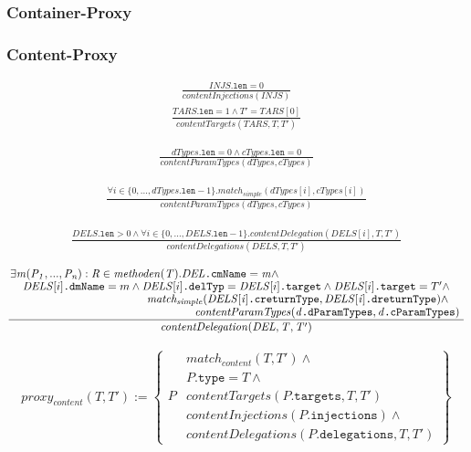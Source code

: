 \documentclass[a4paper,12pt]{article}
\begin{document}
\subsubsection{Container-Proxy}
\subsubsection{Content-Proxy}

\begin{gather*}
\frac{\mathit{INJS}\texttt{.len} = 0}{\mathit{contentInjections(INJS)}}
\end{gather*}
\begin{gather*}
\frac{\mathit{TARS}\texttt{.len} = 1 \wedge T' = \mathit{TARS}[0]}{\mathit{contentTargets(TARS,T,T')}}
\end{gather*}

\begin{gather*}
\frac{\mathit{dTypes}\texttt{.len} = 0 \wedge \mathit{cTypes}\texttt{.len} = 0}{\mathit{contentParamTypes(dTypes, cTypes)}}
\end{gather*}

\begin{gather*}
\frac{\forall i \in \mathit{\{0},...,\mathit{dTypes\texttt{.len}-1\}}.\mathit{match_{simple}(dTypes[i], cTypes[i])} }{\mathit{contentParamTypes(dTypes, cTypes)}}
\end{gather*}

\begin{gather*}
\frac{\mathit{DELS}\texttt{.len} > 0 \wedge \forall \mathit{i} \in \mathit{\{0,...,DELS\texttt{.len}-1\}}.\mathit{contentDelegation(DELS[i],T,T')}}{\mathit{contentDelegations(DELS,T,T')}}
\end{gather*}

\begin{gather*}
\frac{\splitfrac{\exists \mathit{m(P_1,...,P_n):R} \in \mathit{methoden(T).\mathit{DEL}\texttt{.cmName} = m \wedge}}
{\splitfrac{ \mathit{DELS}[i]\texttt{.dmName} = m \wedge \mathit{DELS}[i]\texttt{.delTyp} = \mathit{DELS}[i]\texttt{.target} \wedge \mathit{DELS}[i]\texttt{.target} = T' \wedge}{\splitfrac{\mathit{match_{simple}(\mathit{DELS}[i]\texttt{.creturnType}, \mathit{DELS}[i]\texttt{.dreturnType})}\wedge }
{ \mathit{contentParamTypes(d\texttt{.dParamTypes}, d\texttt{.cParamTypes})}}
}}}
{\mathit{contentDelegation(DEL,T,T')}}
\end{gather*}


\begin{gather*}
proxy_{content}(T,T') := 
\left\{\begin{array}{l|l}
		& \mathit{match_{content}(T,T')} \wedge \\
		& P\texttt{.type} = T \wedge \\
P		& \mathit{contentTargets(P\texttt{.targets},T,T')} \\
		& \mathit{contentInjections(P\texttt{.injections})}  \wedge \\
		& \mathit{contentDelegations(P\texttt{.delegations},T,T')}
\end{array}
\right\}
\end{gather*}
\end{document}

